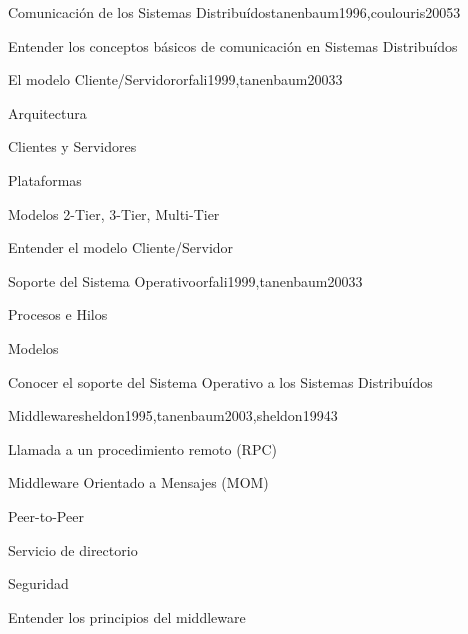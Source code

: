 \begin{syllabus}
\begin{unit}{Comunicación de los Sistemas Distribuídos}{tanenbaum1996,coulouris2005}{3}
   \begin{unitgoals}
      \item Entender los conceptos básicos de comunicación en Sistemas Distribuídos
   \end{unitgoals}
\end{unit}

\begin{unit}{El modelo Cliente/Servidor}{orfali1999,tanenbaum2003}{3}
   \begin{topics}
      \item Arquitectura
      \item Clientes y Servidores
      \item Plataformas
      \item Modelos 2-Tier, 3-Tier, Multi-Tier
   \end{topics}

   \begin{unitgoals}
      \item Entender el modelo Cliente/Servidor
   \end{unitgoals}
\end{unit}

\begin{unit}{Soporte del Sistema Operativo}{orfali1999,tanenbaum2003}{3}
   \begin{topics}
      \item Procesos e Hilos
      \item Modelos
   \end{topics}

   \begin{unitgoals}
      \item Conocer el soporte del Sistema Operativo a los Sistemas Distribuídos
   \end{unitgoals}
\end{unit}

\begin{unit}{Middleware}{sheldon1995,tanenbaum2003,sheldon1994}{3}
   \begin{topics}
      \item Llamada a un procedimiento remoto (RPC)
      \item Middleware Orientado a Mensajes (MOM)
      \item Peer-to-Peer
      \item Servicio de directorio
      \item Seguridad
   \end{topics}

   \begin{unitgoals}
      \item Entender los principios del middleware
   \end{unitgoals}
\end{unit}


\end{syllabus}

